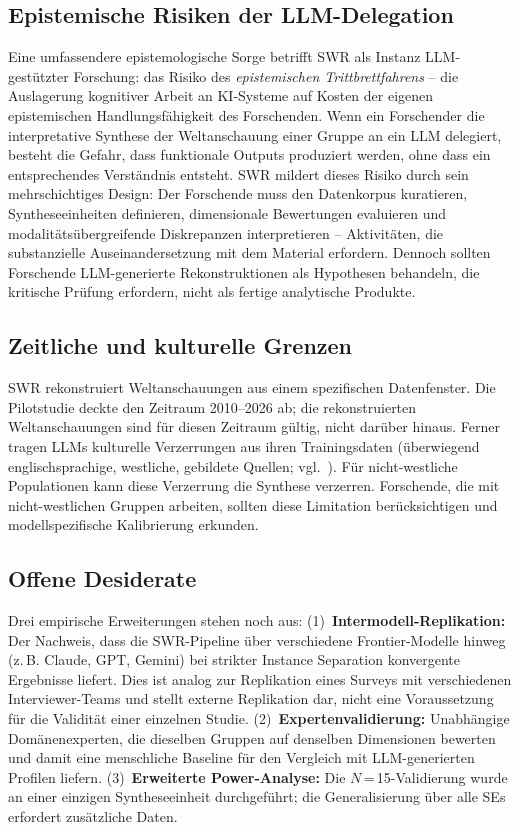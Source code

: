 \documentclass[11pt,a4paper]{article}
\begin{document}
\subsection{Epistemische Risiken der LLM-Delegation}
\label{sec:limitations:epistemic}

Eine umfassendere epistemologische Sorge betrifft SWR als Instanz LLM-gest\"utzter Forschung: das Risiko des \emph{epistemischen Trittbrettfahrens} -- die Auslagerung kognitiver Arbeit an KI-Systeme auf Kosten der eigenen epistemischen Handlungsf\"ahigkeit des Forschenden. Wenn ein Forschender die interpretative Synthese der Weltanschauung einer Gruppe an ein LLM delegiert, besteht die Gefahr, dass funktionale Outputs produziert werden, ohne dass ein entsprechendes Verst\"andnis entsteht. SWR mildert dieses Risiko durch sein mehrschichtiges Design: Der Forschende muss den Datenkorpus kuratieren, Syntheseeinheiten definieren, dimensionale Bewertungen evaluieren und modalit\"ats\"ubergreifende Diskrepanzen interpretieren -- Aktivit\"aten, die substanzielle Auseinandersetzung mit dem Material erfordern. Dennoch sollten Forschende LLM-generierte Rekonstruktionen als Hypothesen behandeln, die kritische Pr\"ufung erfordern, nicht als fertige analytische Produkte.


\subsection{Zeitliche und kulturelle Grenzen}
\label{sec:limitations:temporal}

SWR rekonstruiert Weltanschauungen aus einem spezifischen Datenfenster. Die Pilotstudie deckte den Zeitraum 2010--2026 ab; die rekonstruierten Weltanschauungen sind f\"ur diesen Zeitraum g\"ultig, nicht dar\"uber hinaus. Ferner tragen LLMs kulturelle Verzerrungen aus ihren Trainingsdaten (\"uberwiegend englischsprachige, westliche, gebildete Quellen; vgl.\ \citealp{Santurkar2023}). F\"ur nicht-westliche Populationen kann diese Verzerrung die Synthese verzerren. Forschende, die mit nicht-westlichen Gruppen arbeiten, sollten diese Limitation ber\"ucksichtigen und modellspezifische Kalibrierung erkunden.


\subsection{Offene Desiderate}
\label{sec:limitations:desiderata}

Drei empirische Erweiterungen stehen noch aus: (1)~\textbf{Intermodell-Replikation:} Der Nachweis, dass die SWR-Pipeline \"uber verschiedene Frontier-Modelle hinweg (z.\,B. Claude, GPT, Gemini) bei strikter Instance Separation konvergente Ergebnisse liefert. Dies ist analog zur Replikation eines Surveys mit verschiedenen Interviewer-Teams und stellt externe Replikation dar, nicht eine Voraussetzung f\"ur die Validit\"at einer einzelnen Studie. (2)~\textbf{Expertenvalidierung:} Unabh\"angige Dom\"anenexperten, die dieselben Gruppen auf denselben Dimensionen bewerten und damit eine menschliche Baseline f\"ur den Vergleich mit LLM-generierten Profilen liefern. (3)~\textbf{Erweiterte Power-Analyse:} Die $N$\,=\,15-Validierung wurde an einer einzigen Syntheseeinheit durchgef\"uhrt; die Generalisierung \"uber alle SEs erfordert zus\"atzliche Daten.
\end{document}

